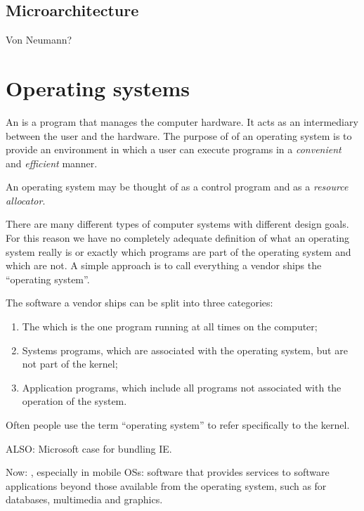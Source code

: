 \subsection{Microarchitecture}
Von Neumann?

\section{Operating systems}
\begin{definition}
An  is a program that manages the computer hardware. It acts as an intermediary between the user and the hardware. The purpose of of an operating system is to provide an environment in which a user can execute programs in a \textit{convenient} and \textit{efficient} manner.
\end{definition}
An operating system may be thought of as a control program and as a \textit{resource allocator}.

There are many different types of computer systems with different design goals. For this reason we have no completely adequate definition of what an operating system really is or exactly which programs are part of the operating system and which are not. A simple approach is to call everything a vendor ships the ``operating system''.

The software a vendor ships can be split into three categories:
\begin{enumerate}
\item The  which is the one program running at all times on the computer;
\item Systems programs, which are associated with the operating system, but are not part of the kernel;
\item Application programs, which include all programs not associated with the operation of the system.
\end{enumerate}
Often people use the term ``operating system'' to refer specifically to the kernel.

ALSO: Microsoft case for bundling IE.

Now: , especially in mobile OSs: software that provides services to software applications beyond those available from the operating system, such as for databases, multimedia and graphics.

